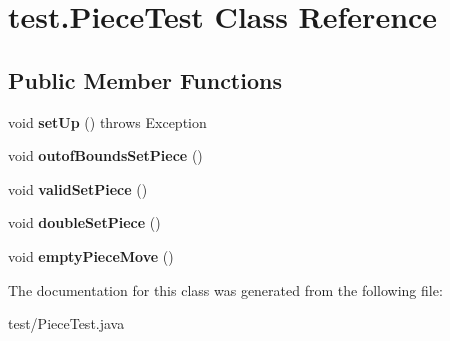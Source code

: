 \hypertarget{classtest_1_1PieceTest}{\section{test.\-Piece\-Test Class Reference}
\label{classtest_1_1PieceTest}
}
\subsection*{Public Member Functions}
\begin{DoxyCompactItemize}
\item 
\hypertarget{classtest_1_1PieceTest_aa78f2de63d4382124aeb5cb18d20c818}{void {\bfseries set\-Up} ()  throws Exception }\label{classtest_1_1PieceTest_aa78f2de63d4382124aeb5cb18d20c818}

\item 
\hypertarget{classtest_1_1PieceTest_aace405af329ed34874c831ad48dd95c7}{void {\bfseries outof\-Bounds\-Set\-Piece} ()}\label{classtest_1_1PieceTest_aace405af329ed34874c831ad48dd95c7}

\item 
\hypertarget{classtest_1_1PieceTest_a02be3c2128dbece1a39e6a5e0f97843d}{void {\bfseries valid\-Set\-Piece} ()}\label{classtest_1_1PieceTest_a02be3c2128dbece1a39e6a5e0f97843d}

\item 
\hypertarget{classtest_1_1PieceTest_a1505849f17d2e6749d1b7a4bcab01515}{void {\bfseries double\-Set\-Piece} ()}\label{classtest_1_1PieceTest_a1505849f17d2e6749d1b7a4bcab01515}

\item 
\hypertarget{classtest_1_1PieceTest_af8ddb64c7bdfbdd3935fa25c9cca165f}{void {\bfseries empty\-Piece\-Move} ()}\label{classtest_1_1PieceTest_af8ddb64c7bdfbdd3935fa25c9cca165f}

\end{DoxyCompactItemize}


The documentation for this class was generated from the following file\-:\begin{DoxyCompactItemize}
\item 
test/Piece\-Test.\-java\end{DoxyCompactItemize}
